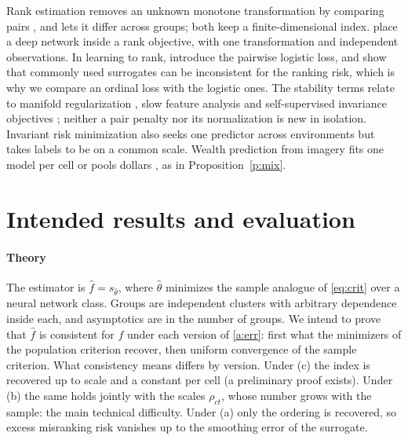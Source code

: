 \documentclass[11pt]{article}
\theoremstyle{tight}
\begin{document}
Rank estimation removes an unknown monotone transformation by comparing pairs
\citep{han1987}, and \citet{abrevaya2000} lets it differ across groups; both keep a
finite-dimensional index. \citet{wang2024} place a deep network inside a rank objective, with
one transformation and independent observations. In learning to rank, \citet{burges2005}
introduce the pairwise logistic loss, and \citet{duchi2010} show that commonly used surrogates
can be inconsistent for the ranking risk, which is why we compare an ordinal loss with the
logistic ones. The stability terms relate to manifold regularization \citep{belkin2006}, slow
feature analysis \citep{wiskott2002} and self-supervised invariance objectives
\citep{bardes2022,jean2019}; neither a pair penalty nor its normalization is new in isolation.
Invariant risk minimization \citep{arjovsky2019} also seeks one predictor across environments
but takes labels to be on a common scale. Wealth prediction from imagery fits one model per
cell \citep{jean2016} or pools dollars \citep{khachiyan2022}, as in Proposition~\ref{p:mix}.

\section{Intended results and evaluation}

\paragraph{Theory}
The estimator is $\hat f=s_{\hat\theta}$, where $\hat\theta$ minimizes the sample analogue of
\eqref{eq:crit} over a neural network class. Groups are independent clusters with arbitrary
dependence inside each, and asymptotics are in the number of groups. We intend to prove that
$\hat f$ is consistent for $f$ under each version of \ref{a:err}: first what the minimizers of
the population criterion recover, then uniform convergence of the sample criterion. What
consistency means differs by version. Under (c) the index is recovered up to scale and a
constant per cell (a preliminary proof exists). Under (b) the same holds jointly with the scales
$\rho_{ct}$, whose number grows with the sample: the main technical difficulty. Under (a) only
the ordering is recovered, so excess misranking risk vanishes up to the smoothing error of the
surrogate.
\end{document}
